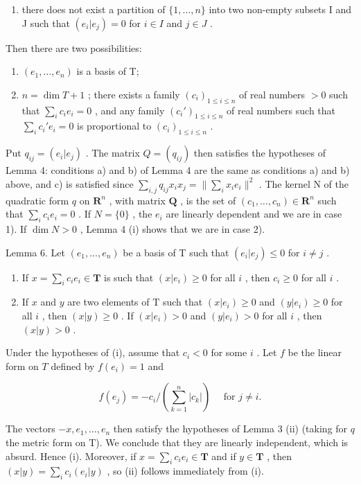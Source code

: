 \begin{enumerate}
\def\labelenumi{\alph{enumi})}
\setcounter{enumi}{1}
\tightlist
\item
  there does not exist a partition of \(\{1, \ldots, n\}\) into two non-empty subsets I and J such that \((e_i|e_j) = 0\) for \(i \in I\) and \(j \in J\) .
\end{enumerate}

Then there are two possibilities:

\begin{enumerate}
\def\labelenumi{\arabic{enumi})}
\item
  \((e_1, \ldots, e_n)\) is a basis of T;
\item
  \(n = \dim T + 1\) ; there exists a family \((c_i)_{1 \leqslant i \leqslant n}\) of real numbers \(> 0\) such that \(\sum_{i} c_i e_i = 0\) , and any family \((c_i')_{1 \leqslant i \leqslant n}\) of real numbers such that \(\sum_{i} c_i' e_i = 0\) is proportional to \((c_i)_{1 \leqslant i \leqslant n}\) .
\end{enumerate}

Put \(q_{ij} = (e_i|e_j)\) . The matrix \(Q = (q_{ij})\) then satisfies the hypotheses of Lemma 4: conditions a) and b) of Lemma 4 are the same as conditions a) and b) above, and c) is satisfied since \(\sum_{i,j} q_{ij} x_i x_j = \|\sum_{i} x_i e_i\|^2\) . The kernel N of the quadratic form \(q\) on \(\mathbf{R}^n\) , with matrix \(\mathbf{Q}\) , is the set of \((c_1, \ldots, c_n) \in \mathbf{R}^n\) such that \(\sum_{i} c_i e_i = 0\) . If \(N = \{0\}\) , the \(e_i\) are linearly dependent and we are in case 1). If \(\dim N > 0\) , Lemma 4 (i) shows that we are in case 2).

Lemma 6. Let \((e_1, \ldots, e_n)\) be a basis of T such that \((e_i | e_j) \leqslant 0\) for \(i \neq j\) .

\begin{enumerate}
\def\labelenumi{(\roman{enumi})}
\item
  If \(x = \sum_{i} c_i e_i \in \mathbf{T}\) is such that \((x|e_i) \geqslant 0\) for all \(i\) , then \(c_i \geqslant 0\) for all \(i\) .
\item
  If \(x\) and \(y\) are two elements of \(\mathrm{T}\) such that \((x|e_i) \geqslant 0\) and \((y|e_i) \geqslant 0\) for all \(i\) , then \((x|y) \geqslant 0\) . If \((x|e_i) > 0\) and \((y|e_i) > 0\) for all \(i\) , then \((x|y) > 0\) .
\end{enumerate}

Under the hypotheses of (i), assume that \(c_{i} < 0\) for some \(i\) . Let \(f\) be the linear form on \(T\) defined by \(f(e_{i}) = 1\) and

\[
f \left(e _ {j}\right) = - c _ {i} / \left(\sum_ {k = 1} ^ {n} \left| c _ {k} \right|\right) \quad \text { for } j \neq i.
\]

The vectors \(-x, e_1, \ldots, e_n\) then satisfy the hypotheses of Lemma 3 (ii) (taking for \(q\) the metric form on T). We conclude that they are linearly independent, which is absurd. Hence (i). Moreover, if \(x = \sum_{i} c_i e_i \in \mathbf{T}\) and if \(y \in \mathbf{T}\) , then \((x|y) = \sum_{i} c_i (e_i | y)\) , so (ii) follows immediately from (i).

